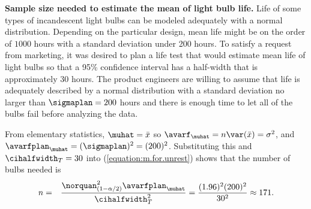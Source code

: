 \begin{example}
\label{example:light.bulb.sample.size}
{\bf Sample size needed to estimate the mean of light bulb life.}
Life of some types of incandescent light bulbs can be modeled
adequately with a normal distribution.  Depending on the particular
design, mean life might be on the order of $1000$ hours with a
standard deviation under 200 hours.  To satisfy a request from
marketing, it was desired to plan a life test that would estimate
mean life of light bulbs so that a 95\% confidence interval has a
half-width that is approximately $30$ hours.  The product
engineers are willing to assume that life is adequately described by
a normal distribution with a standard deviation no larger than
$\sigmaplan=200$ hours and there is enough time to let all of the
bulbs fail before analyzing the data.

From elementary statistics, $\muhat=\bar{x}$
so $\avarf_{\muhat}=n\var(\bar{x}) =
\sigma^2$,
and $\avarfplan_{\muhat}=(\sigmaplan)^2=(200)^2$.
Substituting this and $\cihalfwidth_{T}=30$ into
(\ref{equation:m.for.unrest}) shows that the number of bulbs needed is
\begin{eqnarray*}
n&=&\frac{\norquan_{(1-\alpha/2)}^{2} \avarfplan_{\muhat}}{\cihalfwidth_{T}^{2}}=
\frac{(1.96)^{2} (200)^2}{30^{2}} \approx 171.
\end{eqnarray*}
\end{example}

